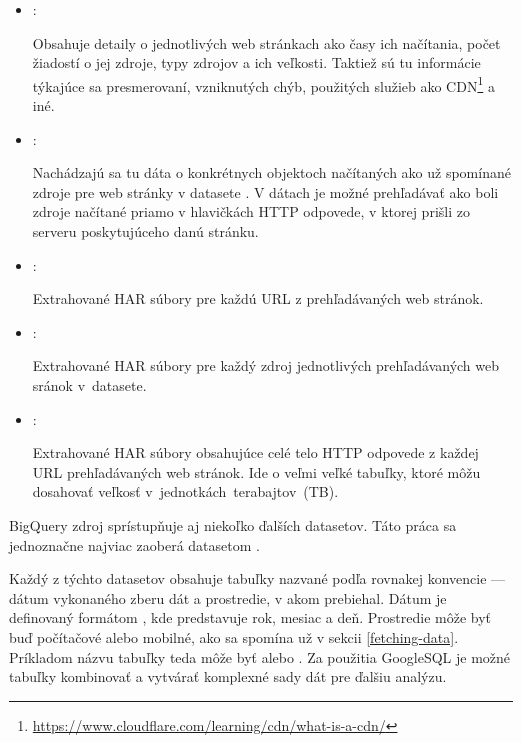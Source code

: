\begin{itemize}
    \item {}:

    Obsahuje detaily o jednotlivých web stránkach ako časy ich načítania, počet žiadostí o jej zdroje, typy zdrojov a ich veľkosti.
    Taktiež sú tu informácie týkajúce sa presmerovaní, vzniknutých chýb, použitých služieb ako CDN\footnote{\href{https://www.cloudflare.com/learning/cdn/what-is-a-cdn/}{https://www.cloudflare.com/learning/cdn/what-is-a-cdn/}} a iné.
    
    \item {}:

    Nachádzajú sa tu dáta o konkrétnych objektoch načítaných ako už spomínané zdroje pre web stránky v datasete .
    V dátach je možné prehľadávať ako boli zdroje načítané priamo v hlavičkách HTTP odpovede, v ktorej prišli zo serveru poskytujúceho danú stránku.
    
    \item {}:

    Extrahované HAR súbory pre každú URL z prehľadávaných web stránok.
    
    \item {}:

    Extrahované HAR súbory pre každý zdroj jednotlivých prehľadávaných web sránok \mbox{v  datasete}.
    
    \item {}:

    Extrahované HAR súbory obsahujúce celé telo HTTP odpovede z každej URL prehľadávaných web stránok.
    Ide o veľmi veľké tabuľky, ktoré môžu dosahovať veľkosť \mbox{v jednotkách terabajtov (TB)}.
\end{itemize}

BigQuery zdroj  sprístupňuje aj niekoľko ďalších datasetov. Táto práca sa jednoznačne najviac zaoberá datasetom .

Každý z týchto datasetov obsahuje tabuľky nazvané podľa rovnakej konvencie --- dátum vykonaného zberu dát a prostredie, v akom prebiehal.
Dátum je definovaný formátom , kde  predstavuje rok,  mesiac a  deň. 
Prostredie môže byť buď počítačové alebo mobilné, ako sa spomína už v sekcii \ref{fetching-data}.
Príkladom názvu tabuľky teda môže byť  alebo .
Za použitia GoogleSQL je možné tabuľky kombinovať a vytvárať komplexné sady dát pre ďalšiu analýzu.

